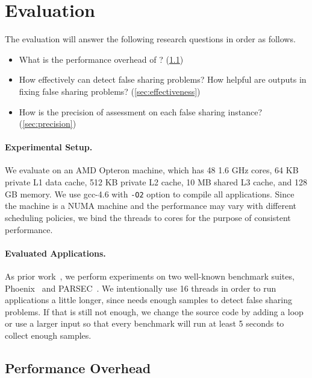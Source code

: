 \section{Evaluation}
\label{sec:eval}

\sloppy{}
The evaluation will answer the following research questions in order as follows. 

\begin{itemize}
\item What is the performance overhead of \cheetah{}? (\ref{sec:perf})

\item How effectively can \cheetah{} detect false sharing problems? How helpful are outputs in fixing false sharing problems? (\ref{sec:effectiveness})

\item How is the precision of assessment on each false sharing instance? (\ref{sec:precision})

\end{itemize}

\paragraph{Experimental Setup.} We evaluate \cheetah{} on an AMD Opteron machine, which has 48 1.6 GHz cores, 64 KB private L1 data cache, 512 KB private L2 cache, 10 MB shared L3 cache, and 128 GB memory. We use gcc-4.6 with {\tt -O2} option to compile all applications. Since the machine is a NUMA machine and the performance may vary with different scheduling policies, we bind the threads to cores for the purpose of consistent performance.   

\paragraph{Evaluated Applications.} As prior work~\cite{Sheriff, Predator, qinzhao, mldetect}, we perform experiments on two well-known benchmark suites, Phoenix~\cite{phoenix-hpca} and PARSEC~\cite{parsec}. We intentionally use 16 threads in order to run applications a little longer, since \cheetah{} needs enough samples to detect false sharing problems. If that is still not enough, we change the source code by adding a loop or use a larger input so that every benchmark will run at least 5 seconds to collect enough samples.

\subsection{Performance Overhead}
\label{sec:perf}

